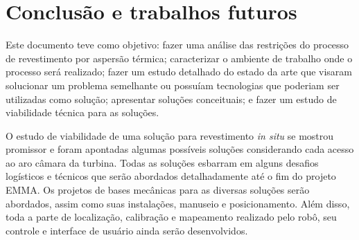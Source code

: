 \section{Conclusão e trabalhos futuros}\label{sec:conclusions}

Este documento teve como objetivo: fazer uma análise das restrições do processo
de revestimento por aspersão térmica; caracterizar o ambiente de trabalho onde o
processo será realizado; fazer um estudo detalhado do estado da arte que
visaram solucionar um problema semelhante ou possuíam tecnologias que
poderiam ser utilizadas como solução; apresentar soluções conceituais; e
fazer um estudo de viabilidade técnica para as soluções. 

O estudo de viabilidade de uma solução para revestimento \textit{in situ} se
mostrou promissor e foram apontadas algumas possíveis soluções considerando cada
acesso ao aro câmara da turbina. Todas as soluções esbarram em alguns desafios
logísticos e técnicos que serão abordados detalhadamente até o fim do projeto
EMMA. Os projetos de bases mecânicas para as diversas soluções serão abordados,
assim como suas instalações, manuseio e posicionamento. Além disso, toda a parte
de localização, calibração e mapeamento realizado pelo robô, seu controle e
interface de usuário ainda serão desenvolvidos.
